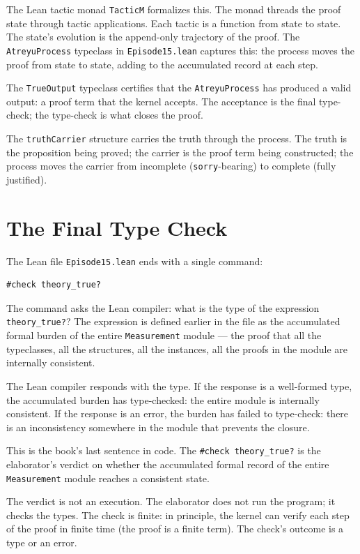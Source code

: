 The Lean tactic monad \texttt{TacticM} formalizes this. The monad
threads the proof state through tactic applications. Each tactic
is a function from state to state. The state's evolution is the
append-only trajectory of the proof. The
\texttt{AtreyuProcess} typeclass in \texttt{Episode15.lean}
captures this: the process moves the proof from state to state,
adding to the accumulated record at each step.

The \texttt{TrueOutput} typeclass certifies that the
\texttt{AtreyuProcess} has produced a valid output: a proof term
that the kernel accepts. The acceptance is the final type-check;
the type-check is what closes the proof.

The \texttt{truthCarrier} structure carries the truth through the
process. The truth is the proposition being proved; the carrier
is the proof term being constructed; the process moves the
carrier from incomplete (\texttt{sorry}-bearing) to complete
(fully justified).

\section{The Final Type Check}
\label{se:the-final-type-check}

The Lean file \texttt{Episode15.lean} ends with a single command:
\begin{verbatim}
#check theory_true?
\end{verbatim}
The command asks the Lean compiler: what is the type of the
expression \texttt{theory\_true?}? The expression is defined
earlier in the file as the accumulated formal burden of the entire
\texttt{Measurement} module --- the proof that all the typeclasses,
all the structures, all the instances, all the proofs in the
module are internally consistent.

The Lean compiler responds with the type. If the response is a
well-formed type, the accumulated burden has type-checked: the
entire module is internally consistent. If the response is an
error, the burden has failed to type-check: there is an
inconsistency somewhere in the module that prevents the closure.

This is the book's last sentence in code. The
\texttt{\#check theory\_true?} is the elaborator's verdict on
whether the accumulated formal record of the entire
\texttt{Measurement} module reaches a consistent state.

The verdict is not an execution. The elaborator does not run the
program; it checks the types. The check is finite: in principle,
the kernel can verify each step of the proof in finite time
(the proof is a finite term). The check's outcome is a type or an
error.

